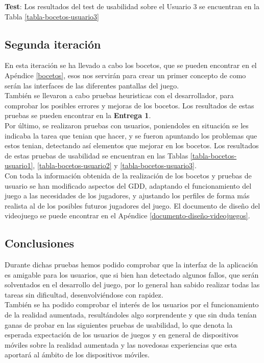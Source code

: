 \begin{itemize}
  \textbf{Test}: Los resultados del test de usabilidad sobre el Usuario 3 se encuentran en la Tabla \ref{tabla-bocetos-usuario3}

\subsection{Segunda iteración}
En esta iteración se ha llevado a cabo los bocetos, que se pueden encontrar en el Apéndice \ref{bocetos}, esos nos servirán para crear un primer concepto de como serán las interfaces de las diferentes pantallas del juego.\\

También se llevaron a cabo pruebas heuristicas con el desarrollador, para comprobar los posibles errores y mejoras de los bocetos. Los resultados de estas pruebas se pueden encontrar en la \textbf{Entrega 1}.\\

Por último, se realizaron pruebas con usuarios, poniendoles en situación se les indicaba la tarea que tenian que hacer, y se fueron apuntando los problemas que estos tenian, detectando así elementos que mejorar en los bocetos. Los resultados de estas pruebas de usabilidad se encuentran en las Tablas \ref{tabla-bocetos-usuario1}, \ref{tabla-bocetos-usuario2} y \ref{tabla-bocetos-usuario3}.\\

Con toda la información obtenida de la realización de los bocetos y pruebas de usuario se han modificado aspectos del GDD, adaptando el funcionamiento del juego a las necesidades de los jugadores, y ajustando los perfiles de forma más realista al de los posibles futuros jugadores del juego. El documento de diseño del videojuego se puede encontrar en el Apéndice \ref{documento-diseño-videojuegos}.

\subsection{Conclusiones}
Durante dichas pruebas hemos podido comprobar que la interfaz de la aplicación es amigable para los usuarios, que si bien han detectado algunos fallos, que serán solventados en el desarrollo del juego, por lo general han sabido realizar todas las tareas sin dificultad, desenvolviéndose con rapidez.\\

También se ha podido comprobar el interés de los usuarios por el funcionamiento de la realidad aumentada, resultándoles algo sorprendente y que sin duda tenían ganas de probar en las siguientes pruebas de usabilidad, lo que denota la esperada expectación de los usuarios de juegos y en general de dispositivos móviles sobre la realidad aumentada y las novedosas experiencias que esta aportará al ámbito de los dispositivos móviles.


\end{itemize}

